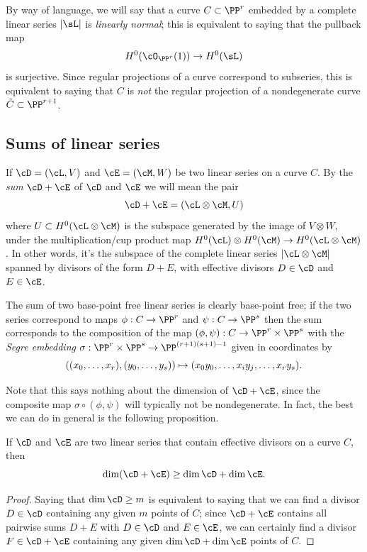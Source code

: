 By way of language, we will say that a curve $C \subset \PP^r$
embedded by a complete linear series $|\sL|$ is
\emph{linearly normal};
%
this is equivalent to saying that the pullback map
$$
H^0(\cO_{\PP^r}(1)) \to H^0(\sL)
$$
is surjective. Since regular projections of a curve correspond to subseries, this is equivalent to saying that $C$ is \emph{not} the regular  projection of a nondegenerate curve $\tilde C \subset \PP^{r+1}$.

\subsection*{Sums of linear series}
If
$\cD = (\cL,V)$ and $\cE = (\cM, W)$ be two linear series on a curve
$C$. By the
\emph{sum}
%
$\cD + \cE$ of $\cD$ and $\cE$
 we will mean the pair
$$
\cD + \cE = (\cL \otimes \cM, U)
$$
where $U \subset H^0(\cL \otimes \cM)$ is the subspace generated by
the image of $V \otimes W$, under the multiplication/cup product map
$H^0(\cL) \otimes H^0(\cM) \to H^0(\cL \otimes \cM)$. In other words,
it's the subspace of the complete linear series $|\cL\otimes \cM|$
spanned by divisors of the form $D+E$, with effective divisors $D \in
\cD$ and $E \in \cE$.

The sum of two base-point free linear series is clearly base-point free; if the two series correspond to maps
$\phi:C\to \PP^r$ and $\psi:C\to \PP^s$ then the sum corresponds to the composition of the map
$(\phi, \psi): C\to \PP^r\times \PP^s$ with the
\emph{Segre embedding}
%
$\sigma : \PP^r\times \PP^s \to \PP^{(r+1)(s+1)-1}$
given in coordinates by
$$
((x_0,\dots, x_r), (y_0, \dots, y_s))\mapsto (x_0y_0, \dots, x_iy_j, \dots, x_ry_s).
\vspace*{-\parskip}
$$

Note that this says nothing about the dimension of $\cD + \cE$, since the composite map $\sigma \circ (\phi, \psi)$ will typically not be nondegenerate. In fact, the best we can do in general is the following proposition.


\begin{proposition}\label{sum of linear series}
 If $\cD$ and $\cE$ are two  linear series that contain effective divisors on a curve $C$, then
$$
\dim(\cD + \cE) \geq \dim \cD + \dim \cE.
\vspace*{-\parskip}
$$
\end{proposition}

\begin{proof}
Saying that
$\dim \cD \geq m$ is equivalent to saying that we can find a divisor
$D \in \cD$ containing any given $m$ points of $C$; since $\cD + \cE$
contains all pairwise sums $D + E$ with $D \in \cD$ and $E \in \cE$,
we can certainly find a divisor $F \in \cD + \cE$ containing any given
$\dim \cD + \dim \cE$ points of $C$.
\end{proof}

